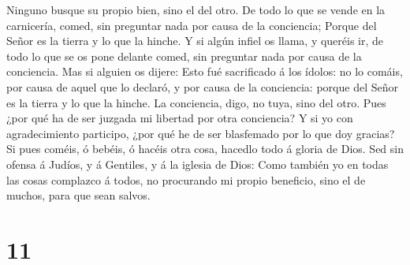  Ninguno busque su propio bien, sino el del otro.
 De todo lo que se vende en la carnicería, comed, sin
preguntar nada por causa de la conciencia;  Porque del
Señor es la tierra y lo que la hinche.  Y si algún infiel
os llama, y queréis ir, de todo lo que se os pone delante comed, sin
preguntar nada por causa de la conciencia.  Mas si
alguien os dijere: Esto fué sacrificado á los ídolos: no lo comáis, por
causa de aquel que lo declaró, y por causa de la conciencia: porque del
Señor es la tierra y lo que la hinche.  La conciencia,
digo, no tuya, sino del otro. Pues ¿por qué ha de ser juzgada mi
libertad por otra conciencia?  Y si yo con agradecimiento
participo, ¿por qué he de ser blasfemado por lo que doy gracias?
 Si pues coméis, ó bebéis, ó hacéis otra cosa, hacedlo
todo á gloria de Dios.  Sed sin ofensa á Judíos, y á
Gentiles, y á la iglesia de Dios:  Como también yo en
todas las cosas complazco á todos, no procurando mi propio beneficio,
sino el de muchos, para que sean salvos.

\hypertarget{section-10}{%
\section{11}\label{section-10}}

